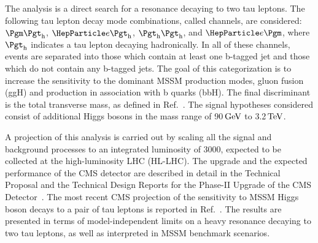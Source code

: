 The analysis is a direct search for a resonance decaying to two tau leptons.
The following tau lepton decay mode combinations, called channels, are considered: $\mutau$, $\etau$,
$\tautau$, and $\emu$, where $\tauhad$ indicates a tau lepton decaying hadronically. In
all of these channels, events are separated into those which contain
at least one b-tagged jet and those which do not contain any b-tagged jets. 
The goal of this categorization is to increase the sensitivity to the dominant MSSM production modes, 
gluon fusion (ggH) and production in association with b quarks (bbH). The final discriminant is the total 
transverse mass, as defined in Ref.~\cite{HIG-17-020}.
The signal hypotheses considered consist of additional Higgs
bosons in the mass range of 90$\,\mathrm{GeV}$ to 3.2$\,\mathrm{TeV}$.

A projection of this analysis is carried out by scaling all the signal
and background processes to an integrated luminosity of 3000\fbinv, expected to be collected at the high-luminosity LHC (HL-LHC). 
The upgrade and the expected performance of the CMS detector are described in detail
in the Technical Proposal and the Technical Design Reports for the Phase-II Upgrade of the CMS 
Detector~\cite{CMSPhase2TP,CMSPhase2TrackerTDR,CMSPhase2BarrelTDR,CMSPhase2MuonTDR,CMSPhase2EndcapTDR}. 
The most recent CMS projection of the sensitivity to MSSM Higgs boson decays to a pair of tau leptons is reported 
in Ref.~\cite{FTR-16-002}.
The results are presented in terms of model-independent limits on a heavy resonance 
decaying to two tau leptons, as well as interpreted in MSSM benchmark scenarios.
